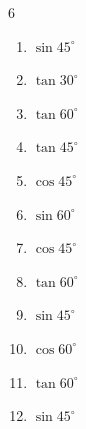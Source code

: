 \begin{multicols}{6}
\begin{enumerate}

  \item $\displaystyle \sin{45^\circ}$


  \item $\displaystyle \tan{30^\circ}$


  \item $\displaystyle \tan{60^\circ}$


  \item $\displaystyle \tan{45^\circ}$

        \phantom{$\displaystyle =1$}

  \item $\displaystyle \cos{45^\circ}$


  \item $\displaystyle \sin{60^\circ}$


  \item $\displaystyle \cos{45^\circ}$


  \item $\displaystyle \tan{60^\circ}$


  \item $\displaystyle \sin{45^\circ}$


  \item $\displaystyle \cos{60^\circ}$


  \item $\displaystyle \tan{60^\circ}$


  \item $\displaystyle \sin{45^\circ}$



\end{enumerate}
\end{multicols}
